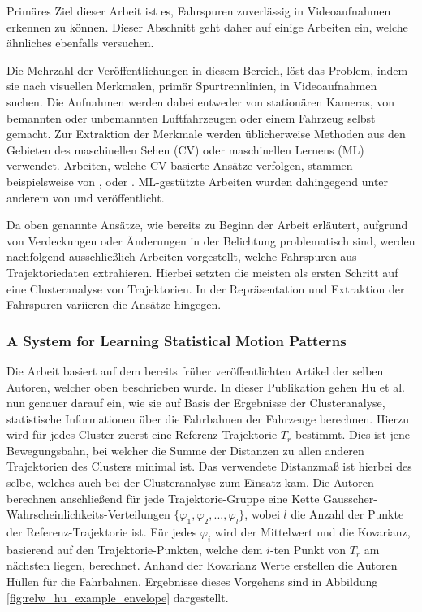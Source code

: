 Primäres Ziel dieser Arbeit ist es, Fahrspuren zuverlässig in Videoaufnahmen erkennen zu können. Dieser Abschnitt
geht daher auf einige Arbeiten ein, welche ähnliches ebenfalls versuchen.

Die Mehrzahl der Veröffentlichungen in diesem Bereich, löst das Problem, indem sie nach visuellen Merkmalen,
primär Spurtrennlinien, in Videoaufnahmen suchen. Die Aufnahmen werden dabei entweder von stationären Kameras,
von bemannten oder unbemannten Luftfahrzeugen oder einem Fahrzeug selbst gemacht. Zur Extraktion der Merkmale werden
üblicherweise Methoden aus den Gebieten des maschinellen Sehen (CV) oder maschinellen Lernens (ML) verwendet. %
Arbeiten, welche CV-basierte Ansätze verfolgen, stammen beispielsweise von \cite[]{Lai2000}, \cite[]{McCall2006} oder \cite[]{Aly2008}.
ML-gestützte Arbeiten wurden dahingegend unter anderem von \cite[]{Kim2008} und \cite[]{Gopalan2012} veröffentlicht.

Da oben genannte Ansätze, wie bereits zu Beginn der Arbeit erläutert, aufgrund von Verdeckungen oder Änderungen
in der Belichtung problematisch sind, werden nachfolgend ausschließlich Arbeiten vorgestellt, welche Fahrspuren
aus Trajektoriedaten extrahieren. Hierbei setzten die meisten als ersten Schritt auf eine Clusteranalyse von Trajektorien.
In der Repräsentation und Extraktion der Fahrspuren variieren die Ansätze hingegen.


\subsubsection*{A System for Learning Statistical Motion Patterns}
Die Arbeit \cite[]{WeimingHu2006} basiert auf dem bereits früher veröffentlichten Artikel \cite[]{Hu2005} der selben Autoren,
welcher oben beschrieben wurde. In dieser Publikation gehen Hu et al. nun genauer darauf ein, wie sie auf Basis
der Ergebnisse der Clusteranalyse, statistische Informationen über die Fahrbahnen der Fahrzeuge berechnen.
Hierzu wird für jedes Cluster zuerst eine Referenz-Trajektorie $T_r$ bestimmt. Dies ist jene Bewegungsbahn,
bei welcher die Summe der Distanzen zu allen anderen Trajektorien des Clusters minimal ist. Das verwendete
Distanzmaß ist hierbei des selbe, welches auch bei der Clusteranalyse zum Einsatz kam.
Die Autoren berechnen anschließend für jede Trajektorie-Gruppe eine Kette Gausscher-Wahrscheinlichkeits-Verteilungen
$\{ \varphi_1, \varphi_2, ..., \varphi_l \}$, wobei $l$ die Anzahl der Punkte der Referenz-Trajektorie ist.
Für jedes $\varphi_i$ wird der Mittelwert und die Kovarianz, basierend auf den Trajektorie-Punkten, welche dem
$i$-ten Punkt von $T_r$ am nächsten liegen, berechnet.
Anhand der Kovarianz Werte erstellen die Autoren Hüllen für die Fahrbahnen. Ergebnisse dieses Vorgehens sind in
Abbildung \ref{fig:relw_hu_example_envelope} dargestellt.

